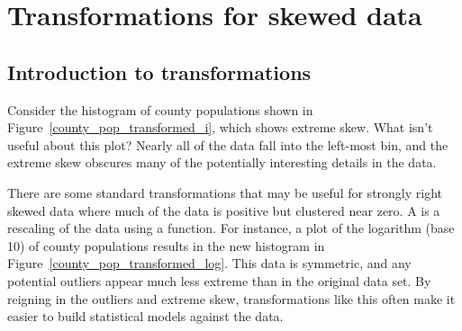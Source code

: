 \section{Transformations for skewed data}
\label{transformationForNonlinearData}


\subsection{Introduction to transformations}

\begin{examplewrap}
\begin{nexample}{Consider the histogram of county populations
    shown in Figure~\ref{county_pop_transformed_i},
    which shows extreme skew.
    What isn't useful about this plot?}
  Nearly all of the data fall into the left-most bin,
  and the extreme skew obscures many of the potentially
  interesting details in the data.
\end{nexample}
\end{examplewrap}





There are some standard transformations that may be
useful for strongly right skewed data where much of the
data is positive but clustered near zero.
A  is a rescaling of the data
using a function.
For instance, a plot of the logarithm (base 10) of
county populations results in the new histogram in
Figure~\ref{county_pop_transformed_log}.
This data is symmetric, and any potential outliers
appear much less extreme than in the original data set.
By reigning in the outliers and extreme skew,
transformations like this often make it easier to build
statistical models against the data.

